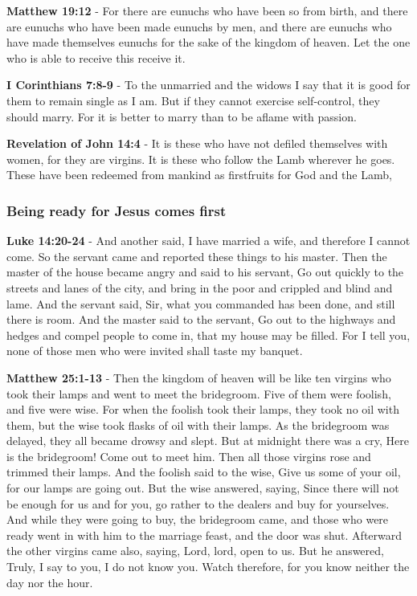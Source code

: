 \documentclass[11pt]{article}
\begin{document}
\textbf{Matthew 19:12} - For there are eunuchs who have been so from birth, and there are eunuchs who have been made eunuchs by men, and there are eunuchs who have made themselves eunuchs for the sake of the kingdom of heaven. Let the one who is able to receive this receive it.

\textbf{I Corinthians 7:8-9} - To the unmarried and the widows I say that it is good for them to remain single as I am. But if they cannot exercise self-control, they should marry. For it is better to marry than to be aflame with passion.

\textbf{Revelation of John 14:4} - It is these who have not defiled themselves with women, for they are virgins. It is these who follow the Lamb wherever he goes. These have been redeemed from mankind as firstfruits for God and the Lamb,

\subsubsection{Being ready for Jesus comes first}
\label{sec:org56bba8b}
\textbf{Luke 14:20-24} - And another said, I have married a wife, and therefore I cannot come. So the servant came and reported these things to his master. Then the master of the house became angry and said to his servant, Go out quickly to the streets and lanes of the city, and bring in the poor and crippled and blind and lame. And the servant said, Sir, what you commanded has been done, and still there is room. And the master said to the servant, Go out to the highways and hedges and compel people to come in, that my house may be filled. For I tell you, none of those men who were invited shall taste my banquet.

\textbf{Matthew 25:1-13} - Then the kingdom of heaven will be like ten virgins who took their lamps and went to meet the bridegroom. Five of them were foolish, and five were wise. For when the foolish took their lamps, they took no oil with them, but the wise took flasks of oil with their lamps. As the bridegroom was delayed, they all became drowsy and slept. But at midnight there was a cry, Here is the bridegroom! Come out to meet him. Then all those virgins rose and trimmed their lamps. And the foolish said to the wise, Give us some of your oil, for our lamps are going out. But the wise answered, saying, Since there will not be enough for us and for you, go rather to the dealers and buy for yourselves. And while they were going to buy, the bridegroom came, and those who were ready went in with him to the marriage feast, and the door was shut. Afterward the other virgins came also, saying, Lord, lord, open to us. But he answered, Truly, I say to you, I do not know you. Watch therefore, for you know neither the day nor the hour.
\end{document}
